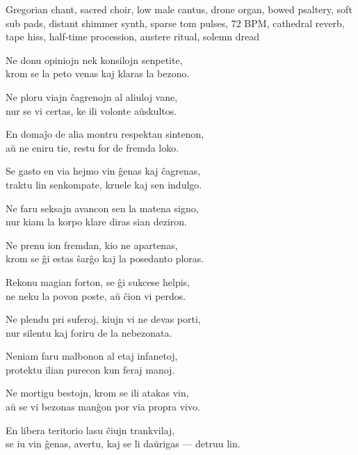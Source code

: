 

\begin{notes}
\end{notes}
\begin{style}
Gregorian chant, sacred choir, low male cantus, drone organ, bowed psaltery, soft sub pads, distant shimmer synth, sparse tom pulses, 72 BPM, cathedral reverb, tape hiss, half-time procession, austere ritual, solemn dread
\end{style}
\begin{lyrics}Ne donu opiniojn nek konsilojn senpetite,\\
krom se la peto venas kaj klaras la bezono.

Ne ploru viajn ĉagrenojn al aliuloj vane,\\
nur se vi certas, ke ili volonte aŭskultos.

En domaĵo de alia montru respektan sintenon,\\
aŭ ne eniru tie, restu for de fremda loko.

Se gasto en via hejmo vin ĝenas kaj ĉagrenas,\\
traktu lin senkompate, kruele kaj sen indulgo.

Ne faru seksajn avancon sen la matena signo,\\
nur kiam la korpo klare diras sian deziron.

Ne prenu ion fremdan, kio ne apartenas,\\
krom se ĝi estas ŝarĝo kaj la posedanto ploras.

Rekonu magian forton, se ĝi sukcese helpis,\\
ne neku la povon poste, aŭ ĉion vi perdos.

Ne plendu pri suferoj, kiujn vi ne devas porti,\\
nur silentu kaj foriru de la nebezonata.

Neniam faru malbonon al etaj infanetoj,\\
protektu ilian purecon kun feraj manoj.

Ne mortigu bestojn, krom se ili atakas vin,\\
aŭ se vi bezonas manĝon por via propra vivo.

En libera teritorio lasu ĉiujn trankvilaj,\\
se iu vin ĝenas, avertu, kaj se li daŭrigas — detruu lin.
\end{lyrics}

